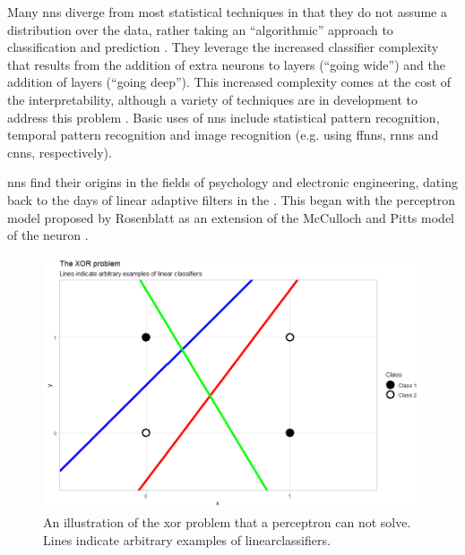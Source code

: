 Many \gls{nn}s diverge from most statistical techniques in that they do not assume a distribution over the data, rather taking an \enquote{algorithmic} approach to classification and prediction \cite{two_cultures}. They leverage the increased classifier complexity that results from the addition of extra neurons to layers (\enquote{going wide}) and the addition of \gls{layer}s (\enquote{going deep}). This increased complexity comes at the cost of the interpretability, although a variety of techniques are in development to address this problem \cite{nn_interpretability}. Basic uses of \gls{nn}s include statistical pattern recognition, temporal pattern recognition and image recognition (e.g. using \gls{ffnn}s, \gls{rnn}s and \gls{cnn}s, respectively).

\gls{nn}s find their origins in the fields of psychology and electronic engineering, dating back to the days of linear adaptive filters in the \cite{haykin}. This began with the perceptron model proposed by Rosenblatt \cite{perceptron_paper} as an extension of the McCulloch and Pitts model of the neuron \cite{logical_calculus}. \bigskip


\begin{figure}
    \centering
    \includegraphics[width=120mm]{figs/xor_problem.png}
    \caption[The \gls{xor} problem]{An illustration of the \gls{xor} problem that a perceptron can not solve. Lines indicate arbitrary examples of \gls{linearclassifier}s.}
    \label{fig:xor_problem}
\end{figure}

